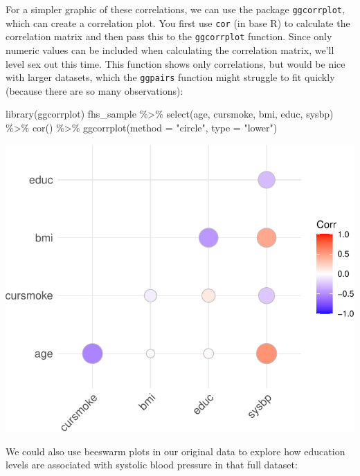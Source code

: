 \documentclass[
]{book}
\newenvironment{Shaded}{\begin{snugshade}}{\end{snugshade}}
\newcommand{\AttributeTok}[1]{\textcolor[rgb]{0.77,0.63,0.00}{#1}}
\newcommand{\FunctionTok}[1]{\textcolor[rgb]{0.00,0.00,0.00}{#1}}
\newcommand{\NormalTok}[1]{#1}
\newcommand{\SpecialCharTok}[1]{\textcolor[rgb]{0.00,0.00,0.00}{#1}}
\newcommand{\StringTok}[1]{\textcolor[rgb]{0.31,0.60,0.02}{#1}}
\begin{document}
For a simpler graphic of these correlations, we can use the package
\texttt{ggcorrplot}, which can create a correlation plot. You first use \texttt{cor} (in base
R) to calculate the correlation matrix and then pass this to the \texttt{ggcorrplot}
function. Since only numeric values can be included when calculating the
correlation matrix, we'll level sex out this time. This function shows only
correlations, but would be nice with larger datasets, which the \texttt{ggpairs}
function might struggle to fit quickly (because there are so many observations):

\begin{Shaded}
\begin{Highlighting}[]
\FunctionTok{library}\NormalTok{(ggcorrplot)}
\NormalTok{fhs\_sample }\SpecialCharTok{\%\textgreater{}\%} 
  \FunctionTok{select}\NormalTok{(age, cursmoke, bmi, educ, sysbp) }\SpecialCharTok{\%\textgreater{}\%} 
  \FunctionTok{cor}\NormalTok{() }\SpecialCharTok{\%\textgreater{}\%} 
  \FunctionTok{ggcorrplot}\NormalTok{(}\AttributeTok{method =} \StringTok{"circle"}\NormalTok{, }\AttributeTok{type =} \StringTok{"lower"}\NormalTok{)}
\end{Highlighting}
\end{Shaded}

\includegraphics{adv_epi_analysis_files/figure-latex/unnamed-chunk-286-1.pdf}

We could also use beeswarm plots in our original data to explore how
education levels are associated with systolic blood pressure in that full
dataset:
\end{document}
